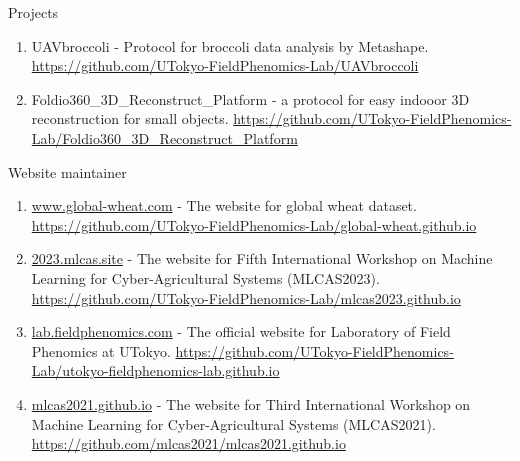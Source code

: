 \begin{singlespace}
\noindent
Projects

\begin{enumerate}
  \item UAVbroccoli - Protocol for broccoli data analysis by Metashape. \url{https://github.com/UTokyo-FieldPhenomics-Lab/UAVbroccoli}
  \item Foldio360\_3D\_Reconstruct\_Platform - a protocol for easy indooor 3D reconstruction for small objects. \url{https://github.com/UTokyo-FieldPhenomics-Lab/Foldio360_3D_Reconstruct_Platform}
\end{enumerate}

\noindent
Website maintainer

\begin{enumerate}
  \item \url{www.global-wheat.com} - The website for global wheat dataset. \url{https://github.com/UTokyo-FieldPhenomics-Lab/global-wheat.github.io}
  \item \url{2023.mlcas.site} - The website for Fifth International Workshop on Machine Learning for Cyber-Agricultural Systems (MLCAS2023). \url{https://github.com/UTokyo-FieldPhenomics-Lab/mlcas2023.github.io}
  \item \url{lab.fieldphenomics.com} - The official website for Laboratory of Field Phenomics at UTokyo. \url{https://github.com/UTokyo-FieldPhenomics-Lab/utokyo-fieldphenomics-lab.github.io}
  \item \url{mlcas2021.github.io} - The website for Third International Workshop on Machine Learning for Cyber-Agricultural Systems (MLCAS2021). \url{https://github.com/mlcas2021/mlcas2021.github.io}
\end{enumerate}

\end{singlespace}